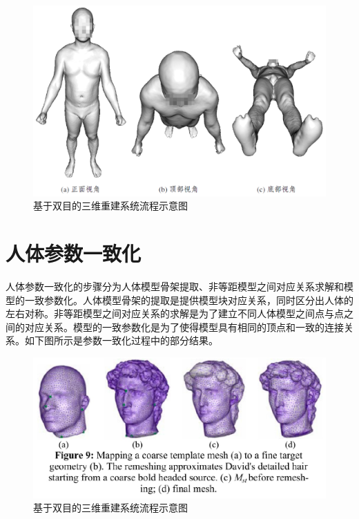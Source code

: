\documentclass[10pt]{article}
\begin{document}
\begin{figure}[H]
\begin{center}
\includegraphics[scale=0.25]{filling-hole-effect.png}
\caption{基于双目的三维重建系统流程示意图}
\end{center}
\end{figure}

\section{人体参数一致化}
人体参数一致化的步骤分为人体模型骨架提取、非等距模型之间对应关系求解和模型的一致参数化。人体模型骨架的提取是提供模型块对应关系，同时区分出人体的左右对称。非等距模型之间对应关系的求解是为了建立不同人体模型之间点与点之间的对应关系。模型的一致参数化是为了使得模型具有相同的顶点和一致的连接关系。如下图所示是参数一致化过程中的部分结果。
\begin{figure}[H]
\begin{center}
\includegraphics[scale=0.3]{parameter.png}
\caption{基于双目的三维重建系统流程示意图}
\end{center}
\end{figure}
\end{document}
